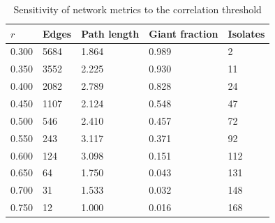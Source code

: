 \begin{table}[!ht]
\centering
\caption{Sensitivity of network metrics to the correlation threshold}
\label{tab:sensitivity}
\begin{tabular}{lllll}
\toprule
$r$ & Edges & Path length & Giant fraction & Isolates \\
\midrule
0.300 & 5684 & 1.864 & 0.989 & 2 \\
0.350 & 3552 & 2.225 & 0.930 & 11 \\
0.400 & 2082 & 2.789 & 0.828 & 24 \\
0.450 & 1107 & 2.124 & 0.548 & 47 \\
0.500 & 546 & 2.410 & 0.457 & 72 \\
0.550 & 243 & 3.117 & 0.371 & 92 \\
0.600 & 124 & 3.098 & 0.151 & 112 \\
0.650 & 64 & 1.750 & 0.043 & 131 \\
0.700 & 31 & 1.533 & 0.032 & 148 \\
0.750 & 12 & 1.000 & 0.016 & 168 \\
\bottomrule
\end{tabular}
\end{table}

